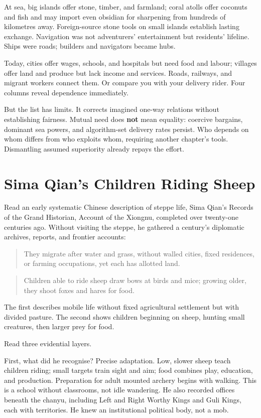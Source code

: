 At sea, big islands offer stone, timber, and farmland; coral atolls offer coconuts and fish and may import even obsidian for sharpening from hundreds of kilometres away. Foreign-source stone tools on small islands establish lasting exchange. Navigation was not adventurers' entertainment but residents' lifeline. Ships were roads; builders and navigators became hubs.

Today, cities offer wages, schools, and hospitals but need food and labour; villages offer land and produce but lack income and services. Roads, railways, and migrant workers connect them. Or compare you with your delivery rider. Four columns reveal dependence immediately.

But the list has limits. It corrects imagined one-way relations without establishing fairness. Mutual need does \textbf{not} mean equality: coercive bargains, dominant sea powers, and algorithm-set delivery rates persist. Who depends on whom differs from who exploits whom, requiring another chapter's tools. Dismantling assumed superiority already repays the effort.

\section{Sima Qian's Children Riding Sheep}
Read an early systematic Chinese description of steppe life, Sima Qian's Records of the Grand Historian, Account of the Xiongnu, completed over twenty-one centuries ago. Without visiting the steppe, he gathered a century's diplomatic archives, reports, and frontier accounts:

\begin{quote}
They migrate after water and grass, without walled cities, fixed residences, or farming occupations, yet each has allotted land.
\end{quote}
\begin{quote}
Children able to ride sheep draw bows at birds and mice; growing older, they shoot foxes and hares for food.
\end{quote}
The first describes mobile life without fixed agricultural settlement but with divided pasture. The second shows children beginning on sheep, hunting small creatures, then larger prey for food.

Read three evidential layers.

First, what did he recognise? Precise adaptation. Low, slower sheep teach children riding; small targets train sight and aim; food combines play, education, and production. Preparation for adult mounted archery begins with walking. This is a school without classrooms, not idle wandering. He also recorded offices beneath the chanyu, including Left and Right Worthy Kings and Guli Kings, each with territories. He knew an institutional political body, not a mob.

